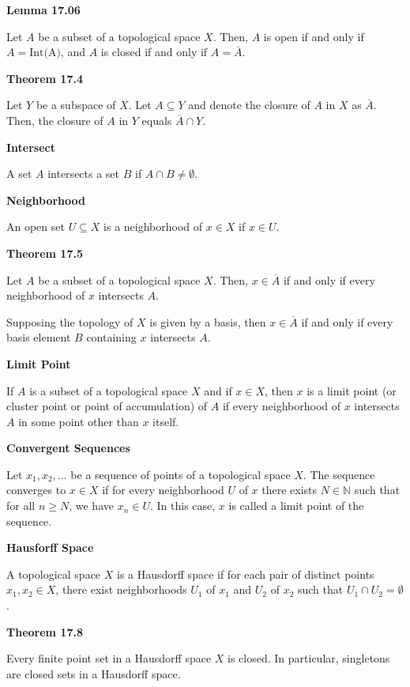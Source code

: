 \documentclass{article}
\begin{document}
\medskip\noindent\textbf{Lemma 17.06}

    Let $A$ be a subset of a topological space $X$. Then, $A$ is open if and only if $A = \text{Int(A)}$, and $A$ is closed if and only if $A=\overline A$.

\medskip\noindent\textbf{Theorem 17.4}

    Let $Y$ be a subspace of $X$. Let $A \subseteq Y$ and denote the closure of $A$ in $X$ as $\overline A$. Then, the closure of $A$ in $Y$ equals $\overline A \cap Y$.

\medskip\noindent\textbf{Intersect}

    A set $A$ intersects a set $B$ if $A \cap B \neq \emptyset$.

\medskip\noindent\textbf{Neighborhood}

    An open set $U \subseteq X$ is a neighborhood of $x \in X$ if $x \in U$.

\medskip\noindent\textbf{Theorem 17.5}

    Let $A$ be a subset of a topological space $X$.
    Then, $x \in \overline A$ if and only if every neighborhood of $x$ intersects $A$.

    Supposing the topology of $X$ is given by a basis, then $x \in \overline A$ if and only if every basis element $B$ containing $x$ intersects $A$.

\medskip\noindent\textbf{Limit Point}

    If $A$ is a subset of a topological space $X$ and if $x \in X$, then $x$ is a limit point (or cluster point or point of accumulation) of $A$ if every neighborhood of $x$ intersects $A$ in some point other than $x$ itself.

\medskip\noindent\textbf{Convergent Sequences}

    Let $x_1, x_2, \hdots$ be a sequence of points of a topological space $X$.
    The sequence converges to $x \in X$ if for every neighborhood $U$ of $x$ there exists $N \in \mathbb N$ such that for all $n \geq N$, we have $x_n \in U$. 
    In this case, $x$ is called a limit point of the sequence.

\medskip\noindent\textbf{Hausforff Space}

    A topological space $X$ is a Hausdorff space if for each pair of distinct points $x_1, x_2 \in X$, there exist neighborhoods $U_1$ of $x_1$ and $U_2$ of $x_2$ such that $U_1 \cap U_2 = \emptyset$.

\medskip\noindent\textbf{Theorem 17.8}

    Every finite point set in a Hausdorff space $X$ is closed. In particular, singletons are closed sets in a Hausdorff space.
\end{document}
